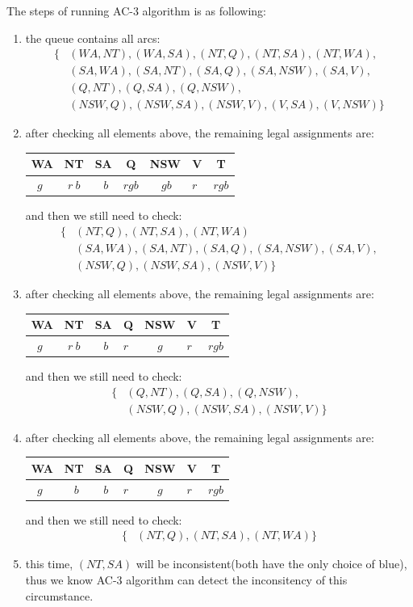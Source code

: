 \documentclass[UTF8]{article}
\begin{document}
\noindent The steps of running AC-3 algorithm is as following:
\begin{enumerate}[label={\arabic*. }]
\item the queue contains all arcs: 
	\begin{align*}
	\{&(WA,NT), (WA,SA), (NT,Q),(NT,SA),(NT,WA), \\
	&(SA,WA),(SA,NT),(SA,Q),(SA,NSW),(SA,V),\\
	&(Q,NT),(Q,SA),(Q,NSW),\\
	&(NSW,Q),(NSW,SA),(NSW,V),(V,SA),(V,NSW)\}
	\end{align*}
\item after checking all elements above, the remaining legal assignments are: 
	\begin{center}
	\begin{tabular}{|c|c|c|c|c|c|c|}
	\hline
	WA & NT & SA & Q & NSW & V & T \\
	\hline
	$g\ \ $ & $r\ b$ & $\ \ b$ & $rgb$ & $\ gb$ & $r\ \ $ & $rgb$ \\
	\hline
	\end{tabular}
	\end{center}
	and then we still need to check:
	\begin{align*}
	\{&(NT,Q),(NT,SA),(NT,WA)\\
	&(SA,WA),(SA,NT),(SA,Q),(SA,NSW),(SA,V),\\
	&(NSW,Q),(NSW,SA),(NSW,V)\}
	\end{align*}
\item after checking all elements above, the remaining legal assignments are: 
	\begin{center}
	\begin{tabular}{|c|c|c|c|c|c|c|}
	\hline
	WA & NT & SA & Q & NSW & V & T \\
	\hline
	$g\ \ $ & $r\ b$ & $\ \ b$ & $r\ \ $ & $\ g\ $ & $r\ \ $ & $rgb$ \\
	\hline
	\end{tabular}
	\end{center}
	and then we still need to check:
	\begin{align*}
	\{&(Q,NT),(Q,SA),(Q,NSW),\\
	&(NSW,Q),(NSW,SA),(NSW,V)\}
	\end{align*}
\item after checking all elements above, the remaining legal assignments are: 
	\begin{center}
	\begin{tabular}{|c|c|c|c|c|c|c|}
	\hline
	WA & NT & SA & Q & NSW & V & T \\
	\hline
	$g\ \ $ & $\ \ b$ & $\ \ b$ & $r\ \ $ & $\ g\ $ & $r\ \ $ & $rgb$ \\
	\hline
	\end{tabular}
	\end{center}
	and then we still need to check:
	\begin{align*}
	\{&(NT,Q),(NT,SA),(NT,WA)\}
	\end{align*}
\item this time, $(NT,SA)$ will be inconsistent(both have the only choice of blue), thus we know AC-3 algorithm can detect the inconsitency of this circumstance.
\end{enumerate}
\end{document}
